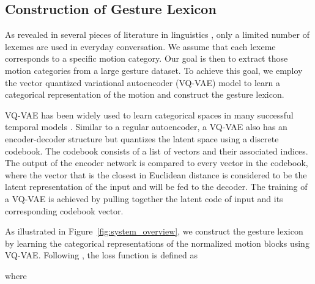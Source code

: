 \documentclass[acmtog,authorversion]{acmart}
\newcommand{\fig}{Figure{}~}
\begin{document}
\subsection{Construction of Gesture Lexicon}
\label{subsec:gesture_style_embedding}
As revealed in several pieces of literature in linguistics \cite{Neff2008Gesture,Kipp2004_Gesture,Webb1996_Linguistic}, only a limited number of lexemes are used in everyday conversation. We assume that each lexeme corresponds to a specific motion category. Our goal is then to extract those motion categories from a large gesture dataset. To achieve this goal, we employ the vector quantized variational autoencoder (VQ-VAE) model \cite{oord2017neural} to learn a categorical representation of the motion and construct the gesture lexicon.

VQ-VAE has been widely used to learn categorical spaces in many successful temporal models \cite{prafulla2020jukebox, baevski2020vq-wav2vec, yan2021videogpt,ramesh2021DALLE}. Similar to a regular autoencoder, a VQ-VAE also has an encoder-decoder structure but quantizes the latent space using a discrete codebook. The codebook consists of a list of vectors and their associated indices. The output of the encoder network is compared to every vector in the codebook, where the vector that is the closest in Euclidean distance is considered to be the latent representation of the input and will be fed to the decoder. The training of a VQ-VAE is achieved by pulling together the latent code of input and its corresponding codebook vector.

As illustrated in \fig\ref{fig:system_overview}, we construct the gesture lexicon by learning the categorical representations of the normalized motion blocks using VQ-VAE. Following \cite{oord2017neural}, the loss function is defined as

where
\end{document}
